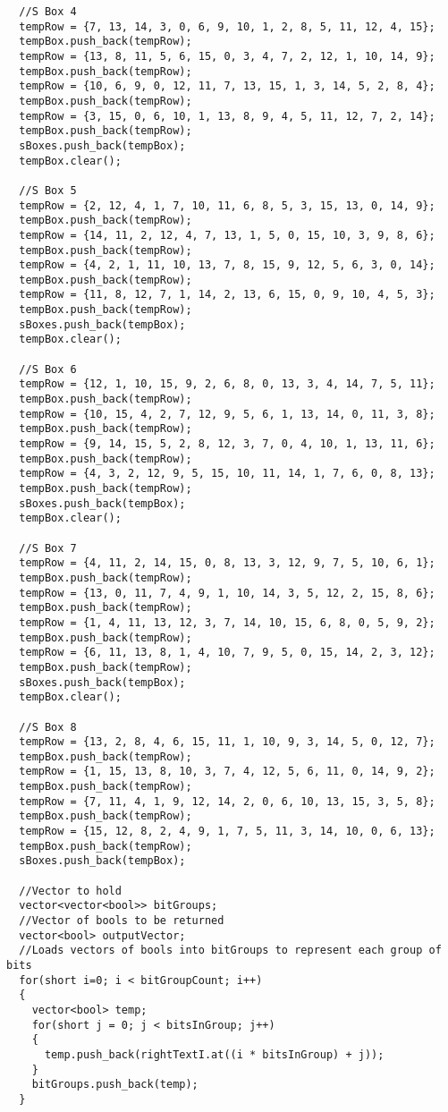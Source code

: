 \documentclass[11pt]{article}
\begin{document}
\begin{verbatim}
  //S Box 4
  tempRow = {7, 13, 14, 3, 0, 6, 9, 10, 1, 2, 8, 5, 11, 12, 4, 15};
  tempBox.push_back(tempRow);
  tempRow = {13, 8, 11, 5, 6, 15, 0, 3, 4, 7, 2, 12, 1, 10, 14, 9};
  tempBox.push_back(tempRow);
  tempRow = {10, 6, 9, 0, 12, 11, 7, 13, 15, 1, 3, 14, 5, 2, 8, 4};
  tempBox.push_back(tempRow);
  tempRow = {3, 15, 0, 6, 10, 1, 13, 8, 9, 4, 5, 11, 12, 7, 2, 14};
  tempBox.push_back(tempRow);
  sBoxes.push_back(tempBox);
  tempBox.clear();

  //S Box 5
  tempRow = {2, 12, 4, 1, 7, 10, 11, 6, 8, 5, 3, 15, 13, 0, 14, 9};
  tempBox.push_back(tempRow);
  tempRow = {14, 11, 2, 12, 4, 7, 13, 1, 5, 0, 15, 10, 3, 9, 8, 6};
  tempBox.push_back(tempRow);
  tempRow = {4, 2, 1, 11, 10, 13, 7, 8, 15, 9, 12, 5, 6, 3, 0, 14};
  tempBox.push_back(tempRow);
  tempRow = {11, 8, 12, 7, 1, 14, 2, 13, 6, 15, 0, 9, 10, 4, 5, 3};
  tempBox.push_back(tempRow);
  sBoxes.push_back(tempBox);
  tempBox.clear();

  //S Box 6
  tempRow = {12, 1, 10, 15, 9, 2, 6, 8, 0, 13, 3, 4, 14, 7, 5, 11};
  tempBox.push_back(tempRow);
  tempRow = {10, 15, 4, 2, 7, 12, 9, 5, 6, 1, 13, 14, 0, 11, 3, 8};
  tempBox.push_back(tempRow);
  tempRow = {9, 14, 15, 5, 2, 8, 12, 3, 7, 0, 4, 10, 1, 13, 11, 6};
  tempBox.push_back(tempRow);
  tempRow = {4, 3, 2, 12, 9, 5, 15, 10, 11, 14, 1, 7, 6, 0, 8, 13};
  tempBox.push_back(tempRow);
  sBoxes.push_back(tempBox);
  tempBox.clear();

  //S Box 7
  tempRow = {4, 11, 2, 14, 15, 0, 8, 13, 3, 12, 9, 7, 5, 10, 6, 1};
  tempBox.push_back(tempRow);
  tempRow = {13, 0, 11, 7, 4, 9, 1, 10, 14, 3, 5, 12, 2, 15, 8, 6};
  tempBox.push_back(tempRow);
  tempRow = {1, 4, 11, 13, 12, 3, 7, 14, 10, 15, 6, 8, 0, 5, 9, 2};
  tempBox.push_back(tempRow);
  tempRow = {6, 11, 13, 8, 1, 4, 10, 7, 9, 5, 0, 15, 14, 2, 3, 12};
  tempBox.push_back(tempRow);
  sBoxes.push_back(tempBox);
  tempBox.clear();

  //S Box 8
  tempRow = {13, 2, 8, 4, 6, 15, 11, 1, 10, 9, 3, 14, 5, 0, 12, 7};
  tempBox.push_back(tempRow);
  tempRow = {1, 15, 13, 8, 10, 3, 7, 4, 12, 5, 6, 11, 0, 14, 9, 2};
  tempBox.push_back(tempRow);
  tempRow = {7, 11, 4, 1, 9, 12, 14, 2, 0, 6, 10, 13, 15, 3, 5, 8};
  tempBox.push_back(tempRow);
  tempRow = {15, 12, 8, 2, 4, 9, 1, 7, 5, 11, 3, 14, 10, 0, 6, 13};
  tempBox.push_back(tempRow);
  sBoxes.push_back(tempBox);

  //Vector to hold
  vector<vector<bool>> bitGroups;
  //Vector of bools to be returned
  vector<bool> outputVector;
  //Loads vectors of bools into bitGroups to represent each group of bits
  for(short i=0; i < bitGroupCount; i++)
  {
    vector<bool> temp;
    for(short j = 0; j < bitsInGroup; j++)
    {
      temp.push_back(rightTextI.at((i * bitsInGroup) + j));
    }
    bitGroups.push_back(temp);
  }


\end{verbatim}
\end{document}
